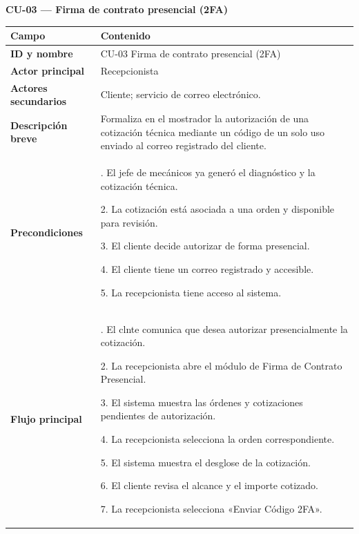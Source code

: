 \textbf{CU-03 --- Firma de contrato presencial (2FA)}

{\def\LTcaptype{none} %
\begin{longtable}[]{@{}
  >{\raggedright\arraybackslash}p{}
  >{\raggedright\arraybackslash}p{}@{}}
\toprule\noalign{}
\begin{minipage}[b]{\linewidth}\raggedright
\textbf{Campo}
\end{minipage} & \begin{minipage}[b]{\linewidth}\raggedright
\textbf{Contenido}
\end{minipage} \\
\midrule\noalign{}
\endhead
\bottomrule\noalign{}
\endlastfoot
\textbf{ID y nombre} & CU-03 Firma de contrato presencial (2FA) \\
\textbf{Actor principal} & Recepcionista \\
\textbf{Actores secundarios} & Cliente; servicio de correo
electrónico. \\
\textbf{Descripción breve} & Formaliza en el mostrador la autorización
de una cotización técnica mediante un código de un solo uso enviado al
correo registrado del cliente. \\
\textbf{Precondiciones} & 1. El jefe de mecánicos ya generó el
diagnóstico y la cotización técnica.

2. La cotización está asociada a una orden y disponible para revisión.

3. El cliente decide autorizar de forma presencial.

4. El cliente tiene un correo registrado y accesible.

5. La recepcionista tiene acceso al sistema. \\
\textbf{Flujo principal} & 1. El clnte comunica que desea autorizar
presencialmente la cotización.

2. La recepcionista abre el módulo de Firma de Contrato Presencial.

3. El sistema muestra las órdenes y cotizaciones pendientes de
autorización.

4. La recepcionista selecciona la orden correspondiente.

5. El sistema muestra el desglose de la cotización.

6. El cliente revisa el alcance y el importe cotizado.

7. La recepcionista selecciona «Enviar Código 2FA».


\end{longtable}}
